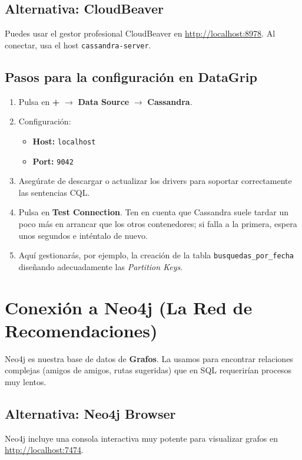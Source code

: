 \documentclass[12pt,a4paper]{article}
\begin{document}
\subsection{Alternativa: CloudBeaver}
Puedes usar el gestor profesional CloudBeaver en \url{http://localhost:8978}. Al conectar, usa el host \texttt{cassandra-server}.

\subsection{Pasos para la configuración en DataGrip}
\begin{enumerate}
    \item Pulsa en \textbf{+} $\rightarrow$ \textbf{Data Source} $\rightarrow$ \textbf{Cassandra}.
    \item Configuración:
    \begin{itemize}
        \item \textbf{Host:} \texttt{localhost}
        \item \textbf{Port:} \texttt{9042}
    \end{itemize}
    \item Asegúrate de descargar o actualizar los drivers para soportar correctamente las sentencias CQL.
    \item Pulsa en \textbf{Test Connection}. Ten en cuenta que Cassandra suele tardar un poco más en arrancar que los otros contenedores; si falla a la primera, espera unos segundos e inténtalo de nuevo.
    \item Aquí gestionarás, por ejemplo, la creación de la tabla \texttt{busquedas\_por\_fecha} diseñando adecuadamente las \textit{Partition Keys}.
\end{enumerate}

\section{Conexión a Neo4j (La Red de Recomendaciones)}
Neo4j es nuestra base de datos de \textbf{Grafos}. La usamos para encontrar relaciones complejas (amigos de amigos, rutas sugeridas) que en SQL requerirían procesos muy lentos.

\subsection{Alternativa: Neo4j Browser}
Neo4j incluye una consola interactiva muy potente para visualizar grafos en \url{http://localhost:7474}.
\end{document}
